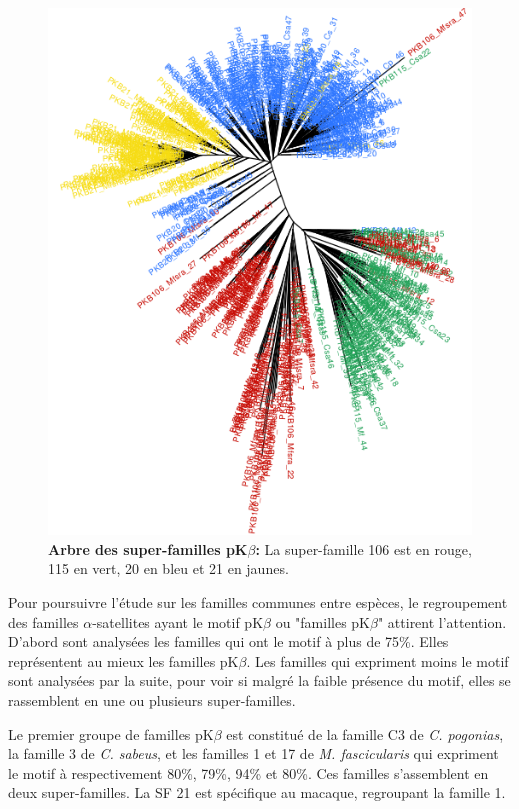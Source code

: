 \documentclass[12pt,a4paper]{article}
\begin{document}
	\begin{figure}	
			\centering
				\includegraphics[scale=0.4, angle =90]{img/pkb_tree.png}				
				\caption{\textbf{Arbre des super-familles pK$\beta$:} La super-famille 106 est en rouge, 115 en vert, 20 en bleu et 21 en jaunes.
	\label{fig:pkb_tree}} 
	\end{figure}

	Pour poursuivre l'étude sur les familles communes entre espèces, le regroupement des familles $\alpha$-satellites ayant  le motif pK$\beta$ ou "familles pK$\beta$" attirent l'attention. D'abord sont analysées les familles qui ont le motif à plus de 75\%. Elles représentent au mieux les familles pK$\beta$. Les familles qui expriment moins le motif sont analysées par la suite, pour voir si malgré la faible présence du motif, elles se rassemblent en une ou plusieurs super-familles.
	
	Le premier groupe de familles pK$\beta$ est constitué de la famille C3 de \textit{C. pogonias}, la famille 3 de \textit{C. sabeus}, et les familles 1 et 17 de \textit{M. fascicularis} qui expriment le motif à respectivement 80\%, 79\%, 94\% et 80\%. Ces familles s'assemblent en deux super-familles. La SF 21 est spécifique au macaque, regroupant la famille 1. 
	
\end{document}
